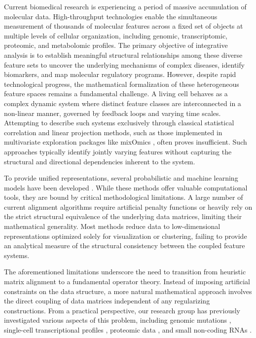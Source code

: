\documentclass[a4paper,twoside,12pt]{article}
\begin{document}
Current biomedical research is experiencing a period of massive accumulation of molecular data. High-throughput technologies enable the simultaneous measurement of thousands of molecular features across a fixed set of objects at multiple levels of cellular organization, including genomic, transcriptomic, proteomic, and metabolomic profiles. The primary objective of integrative analysis is to establish meaningful structural relationships among these diverse feature sets to uncover the underlying mechanisms of complex diseases, identify biomarkers, and map molecular regulatory programs. However, despite rapid technological progress, the mathematical formalization of these heterogeneous feature spaces remains a fundamental challenge. A living cell behaves  as a complex dynamic system where distinct feature classes are interconnected in a non-linear manner, governed by feedback loops and varying time scales. Attempting to describe such systems exclusively through classical statistical correlation and   linear projection methods, such as those implemented in multivariate exploration packages like mixOmics \cite{Rohart2017}, often proves insufficient. Such approaches typically identify jointly varying features without capturing the structural and directional dependencies inherent to the system.





 To provide unified representations, several probabilistic and machine learning models have been developed \cite{Zhang2022,Ashuach2023,KaiCao2022}.   While these methods offer valuable computational tools, they are bound by critical methodological limitations.   A large number  of current alignment algorithms require  artificial penalty functions or heavily rely  on the strict structural equivalence of the underlying data matrices, limiting their mathematical generality.  Most methods reduce data to low-dimensional representations optimized solely for visualization or clustering, failing to provide an analytical measure of the structural consistency between the coupled feature systems.






The aforementioned limitations underscore the need to transition from heuristic matrix alignment to a fundamental operator theory. Instead of imposing artificial constraints on the data structure, a more natural mathematical approach involves the direct coupling of data matrices independent of any   regularizing constructions. From a practical perspective,  our research group has previously investigated various aspects of this problem, including genomic mutations \cite{Mironenko2022}, single-cell transcriptional profiles \cite{Arbatskiy2024}, proteomic data \cite{Kulebyakina2024}, and small non-coding RNAs \cite{Basalova2020}.
\end{document}
